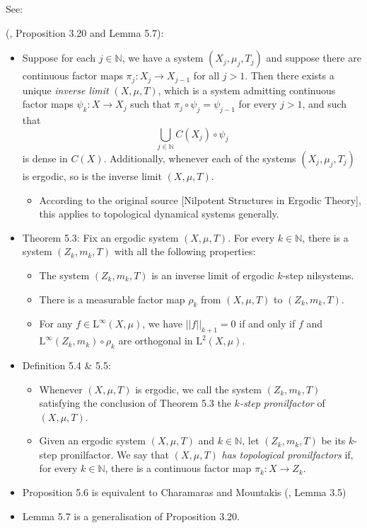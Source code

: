 \documentclass[
  british,
]{article}
\providecommand{\tightlist}{%
  \setlength{\itemsep}{0pt}\setlength{\parskip}{0pt}}
\theoremstyle{plain}
\theoremstyle{remark}
\newcommand{\Measure}{{\mu}}
\begin{document}
See:

(, Proposition 3.20 and
Lemma 5.7):

\begin{itemize}
\tightlist
\item
  Suppose for each \(j\in\mathbb{N}\), we have a system
  \((X_j,\Measure_j,T_j)\) and suppose there are continuous factor maps
  \(\pi_j:X_j\rightarrow X_{j-1}\) for all \(j>1\). Then there exists a
  unique \emph{inverse limit} \((X,\Measure,T)\), which is a system
  admitting continuous factor maps \(\psi_k:X\rightarrow X_j\) such that
  \(\pi_j\circ\psi_j=\psi_{j-1}\) for every \(j>1\), and such that
  \[\bigcup_{j\in\mathbb{N}}C(X_j)\circ\psi_j \] is dense in \(C(X)\).
  Additionally, whenever each of the systems \((X_j,\Measure_j,T_j)\) is
  ergodic, so is the inverse limit \((X,\Measure,T)\).

  \begin{itemize}
  \tightlist
  \item
    According to the original source {[}Nilpotent Structures in Ergodic
    Theory{]}, this applies to topological dynamical systems generally.
  \end{itemize}
\item
  Theorem 5.3: Fix an ergodic system \((X,\Measure,T)\). For every
  \(k\in\mathbb{N}\), there is a system \((Z_k,m_k,T)\) with all the
  following properties:

  \begin{itemize}
  \tightlist
  \item
    The system \((Z_k,m_k,T)\) is an inverse limit of ergodic \(k\)-step
    nilsystems.
  \item
    There is a measurable factor map \(\rho_k\) from \((X,\mu,T)\) to
    \((Z_k,m_k,T)\).
  \item
    For any \(f\in\text{L}^\infty(X,\Measure)\), we have
    \(||f||_{k+1}=0\) if and only if \(f\) and
    \(\text{L}^\infty(Z_k,m_k)\circ\rho_k\) are orthogonal in
    \(\text{L}^2(X,\Measure)\).
  \end{itemize}
\item
  Definition 5.4 \& 5.5:

  \begin{itemize}
  \tightlist
  \item
    Whenever \((X,\Measure,T)\) is ergodic, we call the system
    \((Z_k,m_k,T)\) satisfying the conclusion of Theorem 5.3 the
    \(k\)\emph{-step pronilfactor} of \((X,\Measure,T)\).
  \item
    Given an ergodic system \((X,\Measure,T)\) and \(k\in\mathbb{N}\),
    let \((Z_k,m_k,T)\) be its \(k\)-step pronilfactor. We say that
    \((X,\Measure,T)\) \emph{has topological pronilfactors} if, for
    every \(k\in\mathbb{N}\), there is a continuous factor map
    \(\pi_k:X\rightarrow Z_k\).
  \end{itemize}
\item
  Proposition 5.6 is equivalent to Charamaras and Mountakis
  (, Lemma
  3.5)
\item
  Lemma 5.7 is a generalisation of Proposition 3.20.


\end{itemize}
\end{document}
